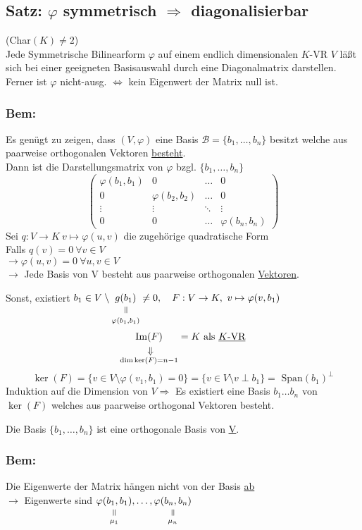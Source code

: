 \documentclass[titlepage,12pt,a4paper,ngerman]{report}
\newcommand{\verteq}{\rotatebox{90}{$\,=$}}
\newcommand{\equalto}[2]{\underset{\scriptstyle\overset{\mkern4mu\verteq}{#2}}{#1}}
\newcommand{\custo}[3]{\underset{\scriptstyle\overset{\mkern4mu\rotatebox{-90}{$\,#1$}}{#3}}{#2}}
\newcommand{\tx}[1]{\textrm{#1}}
\begin{document}
\subsection{Satz: $ \varphi $ symmetrisch $ \Rightarrow $ diagonalisierbar}
(Char$(K) \neq 2$)\\
\indent Jede Symmetrische Bilinearform $\varphi$ auf einem endlich dimensionalen $K$-VR $V$ läßt sich bei einer geeigneten Basisauswahl durch eine Diagonalmatrix darstellen. Ferner ist $\varphi$ nicht-ausg. $\Leftrightarrow$ kein Eigenwert der Matrix null ist.

\subsubsection*{Bem:}
Es genügt zu zeigen, dass $ (V,\varphi) $ eine Basis $ \mathcal{B} = \{b_1,\dots, b_n\} $ besitzt welche aus paarweise orthogonalen Vektoren \underline{besteht}.\\
Dann ist die Darstellungsmatrix von $ \varphi $ bzgl. $ \{b_1,\dots , b_n\}$
$$\begin{pmatrix}
\varphi(b_1,b_1) & 0 & \dots & 0 \\
0 & \varphi(b_2,b_2) & \dots & 0 \\
\vdots& \vdots & \ddots & \vdots \\
0 & 0 &\dots & \varphi(b_n,b_n)
\end{pmatrix}$$
Sei $ q: V \to K \ v \mapsto \varphi(u,v) $ die zugehörige quadratische Form\\
Falls $ q(v) = 0 \ \forall v \in V $\\
$ \rightarrow \varphi(u,v) = 0 \ \forall u,v \in V $\\
$ \rightarrow $ Jede Basis von V besteht aus paarweise orthogonalen \underline{Vektoren}.

Sonst, existiert $b_1 \in V\setminus \equalto{g(b_1)}{\varphi(b_1, b_1)} \neq 0, \quad F:V \to K,\ v \mapsto \varphi(v,b_1)$
$$\custo{\Rightarrow}{\tx{Im}(F)}{\dim \ker (F) = n -1} = K \tx{ als \underline{$K$-VR}}$$
$$\ker (F) = \{v \in V \setminus \varphi(v_1,b_1)=0\} = \{v \in V \setminus v \perp b_1\} = \tx{ Span}(b_1)^\perp$$
Induktion auf die Dimension von $V \Rightarrow$ Es existiert eine Basis $b_1 \dots b_n$ von $\ker(F)$ welches aus paarweise orthogonal Vektoren besteht.

Die Basis $ \{b_1, \dots , b_n\} $ ist eine orthogonale Basis von \underline{\underline{V}}.\\
\subsubsection*{Bem:}
Die Eigenwerte der Matrix hängen nicht von der Basis \underline{ab}\\
$ \rightarrow $ Eigenwerte sind $ \equalto{\varphi(b_1,b_1)}{\mu_1} , \dots , \equalto{\varphi(b_n,b_n)}{\mu_n} $
\end{document}
